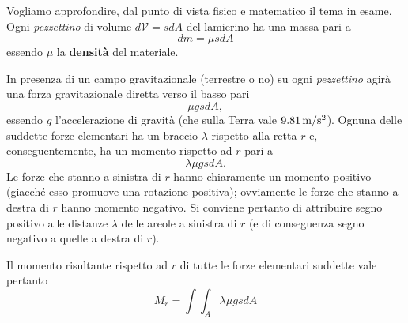 \noindent Vogliamo approfondire, dal punto di vista fisico e matematico il tema in esame. Ogni \emph{pezzettino} di volume $d\mathcal{V}=sdA$ del lamierino ha una massa pari a 
\begin{equation*}
dm = \mu sdA
\end{equation*}
essendo $\mu$ la \textbf{densità} del materiale.

\noindent In presenza di un campo gravitazionale (terrestre o no) su ogni \emph{pezzettino} agirà una forza gravitazionale diretta verso il basso pari 
\begin{equation*}
\mu gsdA,
\end{equation*}
essendo $g$ l'accelerazione di gravità (che sulla Terra vale $9.81\,\textup{m}/\textup{s}^2$). Ognuna delle suddette forze elementari ha un braccio $\lambda$ rispetto alla retta $r$ e, conseguentemente, ha un momento rispetto ad $r$ pari a 
\begin{equation*}
\lambda \mu gsdA.
\end{equation*}
\noindent Le forze che stanno a sinistra di $r$ hanno chiaramente un momento positivo (giacché esso promuove una rotazione positiva); ovviamente le forze che stanno a destra di $r$ hanno momento negativo. Si conviene pertanto di attribuire segno positivo alle distanze $\lambda$ delle areole a sinistra di $r$ (e di conseguenza segno negativo a quelle a destra di $r$). 

\noindent Il momento risultante rispetto ad $r$ di tutte le forze elementari suddette vale pertanto 
\begin{equation*}
M_r = \int\int_A \lambda \mu gsdA
\end{equation*}

